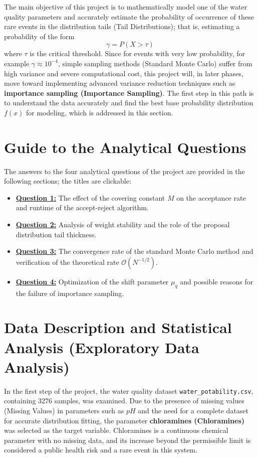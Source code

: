 \documentclass[12pt,a4paper]{article}
\begin{document}
	The main objective of this project is to mathematically model one of the water quality parameters and accurately estimate the probability of occurrence of these rare events in the distribution tails (Tail Distributions); that is, estimating a probability of the form
	\[
	\gamma = P(X > \tau)
	\]
	where $\tau$ is the critical threshold. Since for events with very low probability, for example $\gamma \approx 10^{-4}$, simple sampling methods (Standard Monte Carlo) suffer from high variance and severe computational cost, this project will, in later phases, move toward implementing advanced variance reduction techniques such as \textbf{importance sampling (Importance Sampling)}. The first step in this path is to understand the data accurately and find the best base probability distribution $f(x)$ for modeling, which is addressed in this section.
	
	
	\section*{Guide to the Analytical Questions}
	
	The answers to the four analytical questions of the project are provided in the following sections; the titles are clickable:
	
	\begin{itemize}[leftmargin=2em, itemsep=0.4em]
		\item \hyperref[sec:q1]{\textbf{Question 1:}} The effect of the covering constant $M$ on the acceptance rate and runtime of the accept-reject algorithm.
		\item \hyperref[sec:q2]{\textbf{Question 2:}} Analysis of weight stability and the role of the proposal distribution tail thickness.
		\item \hyperref[sec:q3]{\textbf{Question 3:}} The convergence rate of the standard Monte Carlo method and verification of the theoretical rate $\mathcal{O}(N^{-1/2})$.
		\item \hyperref[sec:q4]{\textbf{Question 4:}} Optimization of the shift parameter $\mu_q$ and possible reasons for the failure of importance sampling.
	\end{itemize}
	
	
	\section{Data Description and Statistical Analysis (Exploratory Data Analysis)}
	
	In the first step of the project, the water quality dataset \texttt{water\_potability.csv}, containing 3276 samples, was examined. Due to the presence of missing values (Missing Values) in parameters such as $pH$ and the need for a complete dataset for accurate distribution fitting, the parameter \textbf{chloramines (Chloramines)} was selected as the target variable. Chloramines is a continuous chemical parameter with no missing data, and its increase beyond the permissible limit is considered a public health risk and a rare event in this system.
	
\end{document}
